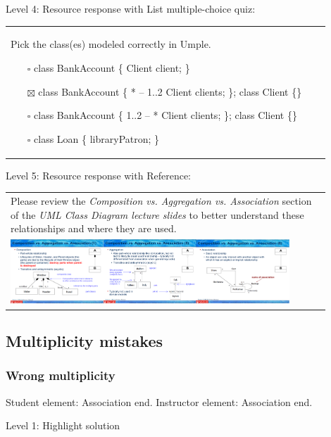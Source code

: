 \noindent Level 4: Resource response with List multiple-choice quiz: \medskip

\begin{tabular}{|p{0.9\linewidth}}

Pick the class(es) modeled correctly in Umple.

\begin{itemize}
    \item[$\square$] class BankAccount \{ Client client; \}
    \item[$\boxtimes$] class BankAccount \{ * -- 1..2 Client clients; \}; class Client \{\}
    \item[$\square$] class BankAccount \{ 1..2 -- * Client clients; \}; class Client \{\}
    \item[$\square$] class Loan \{ libraryPatron; \}
\end{itemize}

\end{tabular} \medskip

\noindent Level 5: Resource response with Reference: \medskip

\begin{tabular}{|p{0.9\linewidth}}
Please review the \textit{Composition vs. Aggregation vs. Association} section of 
the \textit{UML Class Diagram lecture slides} to 
better understand these relationships and where they are used.

\\
\includegraphics[width=0.9\textwidth]{images/composition_aggregation_association.png}
\end{tabular} \medskip


\subsection{Multiplicity mistakes}

\subsubsection{Wrong multiplicity}

Student element: Association end. Instructor element: Association end. \medskip

\noindent Level 1: Highlight solution  \medskip

